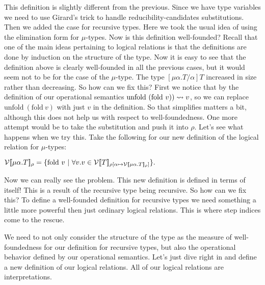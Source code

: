 This definition is slightly different from the previous.  Since we
have type variables we need to use Girard's trick to handle
reducibility-candidates substitutions.  Then we added the case for
recursive types.  Here we took the usual idea of using the elimination
form for $\mu$-types.  Now is this definition well-founded?  Recall
that one of the main ideas pertaining to logical relations is that the
definitions are done by induction on the structure of the type.  Now
it is easy to see that the definition above is clearly well-founded in
all the previous cases, but it would seem not to be for the case of
the $\mu$-type.  The type $[\mu \alpha.T/\alpha]T$ increased in size
rather than decreasing.  So how can we fix this?  First we notice that
by the definition of our operational semantics
$\text{unfold}\ (\text{fold}\ v)) \rightsquigarrow v$, so we can replace
$\text{unfold}\ (\text{fold}\ v)$ with just $v$ in the definition.  So
that simplifies matters a bit, although this does not help us with
respect to well-foundedness.  One more attempt would be to take the
substitution and push it into $\rho$.  Let's see what happens when we
try this.  Take the following for our new definition of the logical
relation for $\mu$-types:
\begin{center}
  \begin{math}
    \mathcal{V}[\negthinspace[\mu \alpha.T]\negthinspace]_\rho  = 
    \{ \text{fold}\ v\ |\ \forall v.
    v \in \mathcal{V}[\negthinspace[T]\negthinspace]_{\rho[\alpha \mapsto \mathcal{V}[\negthinspace[\mu \alpha.T]\negthinspace]_\rho]} \}.
  \end{math}
\end{center}
Now we can really see the problem.  This new definition is defined in
terms of itself!  This is a result of the recursive type being
recursive.  So how can we fix this?  To define a well-founded
definition for recursive types we need something a little more
powerful then just ordinary logical relations.  This is where step
indices come to the rescue.

We need to not only consider the structure of the type as the measure
of well-foundedness for our definition for recursive types, but also
the operational behavior defined by our operational semantics.  Let's
just dive right in and define a new definition of our logical
relations.  All of our logical relations are interpretations.

